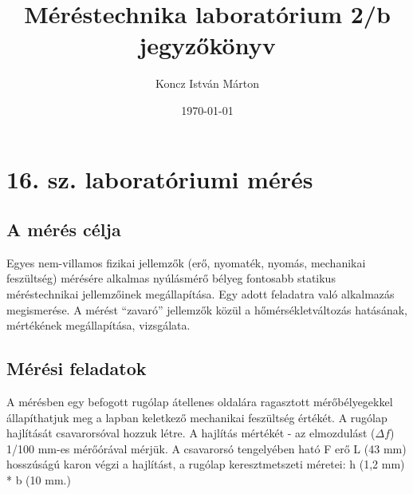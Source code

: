 \documentclass[10pt,a4paper]{article}
\begin{document}
\title{Méréstechnika laboratórium 2/b jegyzőkönyv}
\author{Koncz István Márton}
\date{\today}
\maketitle
\newpage
\section{16. sz. laboratóriumi mérés}
	\subsection{A mérés célja}
	Egyes nem-villamos fizikai jellemzők (erő, nyomaték, nyomás, mechanikai feszültség)
mérésére alkalmas nyúlásmérő bélyeg fontosabb statikus méréstechnikai jellemzőinek
megállapítása. Egy adott feladatra való alkalmazás megismerése. A mérést “zavaró” jellemzők közül a hőmérsékletváltozás hatásának, mértékének megállapítása, vizsgálata.
	\subsection{Mérési feladatok}
	A mérésben egy befogott rugólap átellenes oldalára ragasztott mérőbélyegekkel állapíthatjuk
meg a lapban keletkező mechanikai feszültség értékét. A rugólap hajlítását csavarorsóval
hozzuk létre.
A hajlítás mértékét - az elmozdulást ($\Delta f$) 1/100 mm-es mérőórával mérjük.
A csavarorsó tengelyében ható F erő L (43 mm) hosszúságú karon végzi a hajlítást, a rugólap
keresztmetszeti méretei: h (1,2 mm) * b (10 mm.)
\end{document}
